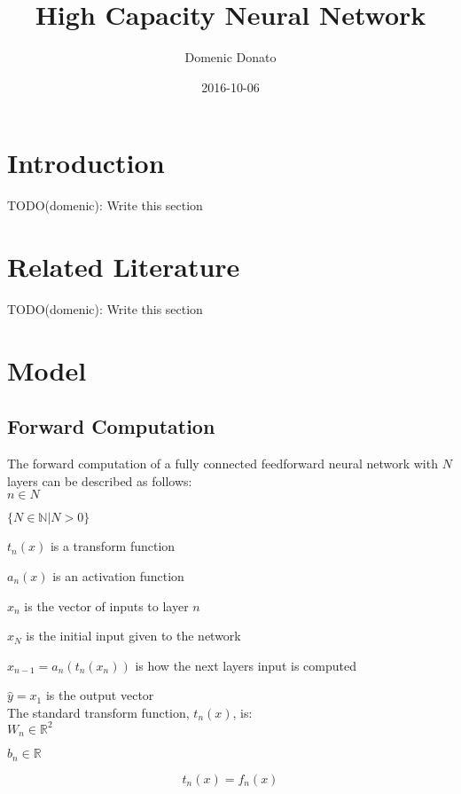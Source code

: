 \documentclass{article}
\title{High Capacity Neural Network}
\date{2016-10-06}
\author{Domenic Donato}
\begin{document}
\maketitle
\newpage
{} 

\section{Introduction}

TODO(domenic): Write this section

\section{Related Literature}

TODO(domenic): Write this section

\section{Model}

\subsection{Forward Computation}

The forward computation of a fully connected feedforward neural network with $N$ layers can be described as follows:\\

${n \in N}$

$\{N \in \mathbb{N} | N > 0\}$

$t_n(x)$ is a transform function

$a_n(x)$ is an activation function

$x_n$ is the vector of inputs to layer $n$

$x_N$ is the initial input given to the network

$x_{n-1} = a_n(t_n(x_n))$ is how the next layers input is computed

$\hat{y} = x_1$ is the output vector\\

The standard transform function, $t_n(x)$, is:\\

$W_n \in \mathbb{R}^2$

$b_n \in \mathbb{R}$

\begin{equation} \label{eq:standard_transform}
t_n(x) = f_n(x)
\end{equation}
\end{document}
